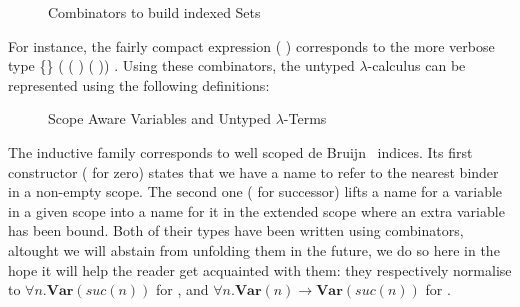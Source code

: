 \begin{figure}[h]
\begin{minipage}{0.45\textwidth}
\end{minipage}\hspace{2em}
\begin{minipage}{0.45\textwidth}
\end{minipage}

\begin{minipage}{0.25\textwidth}
\end{minipage}
\begin{minipage}{0.40\textwidth}
\end{minipage}\hspace{2em}
\begin{minipage}{0.25\textwidth}
\end{minipage}
\caption{Combinators to build indexed Sets}\label{figure:indexed}
\end{figure}

For instance, the fairly compact expression
\AF{[}   (  )   \AF{]}
corresponds to the more verbose type
 \{\}  ( ( )   ( ))   .
Using these combinators, the untyped $\lambda$-calculus can be represented
using the following definitions:

\begin{figure}[h]
\begin{minipage}{0.45\textwidth}
\end{minipage}\hspace{2em}
\begin{minipage}{0.45\textwidth}
\end{minipage}
\caption{Scope Aware Variables and Untyped $\lambda$-Terms\label{scoped-untyped}}
\end{figure}

The inductive family  corresponds to well scoped de Bruijn~\citeyear{de1972lambda}
indices. Its first constructor ( for zero) states that we have a name to refer to
the nearest binder in a non-empty scope. The second one ( for successor) lifts a
name for a variable in a given scope into a name for it in the extended scope where
an extra variable has been bound. Both of their types have been written using combinators,
altought we will abstain from unfolding them in the future, we do so here in the hope
it will help the reader get acquainted with them: they respectively normalise to
$\forall n. \mathbf{Var}(\mathit{suc}(n))$ for ,
and $\forall n. \mathbf{Var}(n) \rightarrow \mathbf{Var}(\mathit{suc}(n))$ for .

